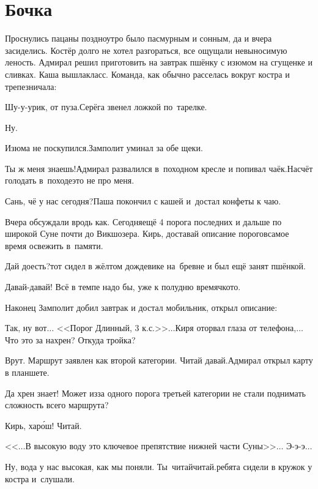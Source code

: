 \chapter{Бочка}
\vepsianrose

Проснулись пацаны поздно\mdash утро было пасмурным и сонным, да и вчера засиделись. Костёр долго не хотел разгораться, все ощущали невыносимую леность. Адмирал решил приготовить на завтрак пшёнку с изюмом на сгущенке и сливках. Каша вышла\mdash класс. Команда, как обычно расселась вокруг костра и трепезничала:

\diagdash Шу-у-урик, от пуза.\mdash Серёга звенел ложкой по~тарелке.

\diagdash Ну.

\diagdash Изюма не поскупился.\mdash Замполит уминал за обе щеки.

\diagdash Ты ж меня знаешь!\mdash Адмирал развалился в~походном кресле и попивал чаёк.\mdash Насчёт голодать в~походе\mdash это не про меня.

\diagdash Сань, чё у нас сегодня?\mdash Паша покончил с кашей и~достал конфеты к чаю.

\diagdash Вчера обсуждали вродь как. Сегодня\mdash ещё 4 порога последних и дальше по широкой Суне почти до Викшозера. Кирь, доставай описание порогов\mdash самое время освежить в~памяти.

\diagdash Дай доесть?\mdash тот сидел в жёлтом дождевике на~бревне и был ещё занят пшёнкой.

\diagdash Давай-давай! Всё в темпе надо бы, уже к полудню времячко\sdash то.

Наконец Замполит добил завтрак и достал мобильник, открыл описание:

\diagdash Так, ну вот$\ldots$ <<Порог Длинный, 3 к.с.>>$\ldots$\mdash Киря оторвал глаза от телефона,\mdash $\ldots$Что это за нахрен? Откуда тройка?

\diagdash Врут. Маршрут заявлен как второй категории. Читай давай.\mdash Адмирал открыл карту в планшете.

\diagdash Да хрен знает! Может из\sdash за одного порога третьей категории не стали поднимать сложность всего маршрута? 

\diagdash Кирь, хар\'ош! Читай.

\diagdash <<$\ldots$В высокую воду это ключевое препятствие нижней части Суны>>$\ldots$ Э-э-э$\ldots$ %

\diagdash Ну, вода у нас высокая, как мы поняли. Ты~читай\sdash читай.\mdash ребята сидели в кружок у костра и~слушали.

